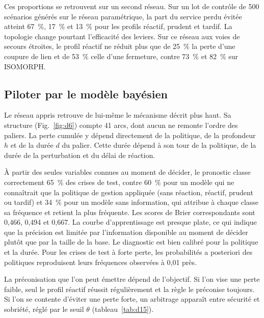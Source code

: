 Ces proportions se retrouvent sur un second réseau. Sur un lot de contrôle de 500 scénarios générés sur le réseau paramétrique, la part du service perdu évitée atteint 67~\%, 17~\% et 13~\% pour les profils réactif, prudent et tardif. La topologie change pourtant l'efficacité des leviers. Sur ce réseau aux voies de secours étroites, le profil réactif ne réduit plus que de 25~\% la perte d'une coupure de lien et de 53~\% celle d'une fermeture, contre 73~\% et 82~\% sur ISOMORPH.

\subsection{Piloter par le modèle bayésien}
\label{sec:4.3}

Le réseau appris retrouve de lui-même le mécanisme décrit plus haut. Sa structure (Fig.~\ref{fig:d6}) compte 41 arcs, dont aucun ne remonte l'ordre des paliers. La perte cumulée y dépend directement de la politique, de la profondeur $h$ et de la durée $d$ du palier. Cette durée dépend à son tour de la politique, de la durée de la perturbation et du délai de réaction.

\begin{center}
\resizebox{\textwidth}{!}{}
\label{fig:d6}
\end{center}

À partir des seules variables connues au moment de décider, le pronostic classe correctement 65~\% des crises de test, contre 60~\% pour un modèle qui ne connaîtrait que la politique de gestion appliquée (sans réaction, réactif, prudent ou tardif) et 34~\% pour un modèle sans information, qui attribue à chaque classe sa fréquence et retient la plus fréquente. Les scores de Brier correspondants sont 0,466, 0,494 et 0,667. La courbe d'apprentissage est presque plate, ce qui indique que la précision est limitée par l'information disponible au moment de décider plutôt que par la taille de la base. Le diagnostic est bien calibré pour la politique et la durée. Pour les crises de test à forte perte, les probabilités a posteriori des politiques reproduisent leurs fréquences observées à 0,01 près.

La préconisation que l'on peut émettre dépend de l'objectif. Si l'on vise une perte faible, seul le profil réactif réussit régulièrement et la règle le préconise toujours. Si l'on se contente d'éviter une perte forte, un arbitrage apparaît entre sécurité et sobriété, réglé par le seuil $\theta$ (tableau~\ref{tab:d15}).

